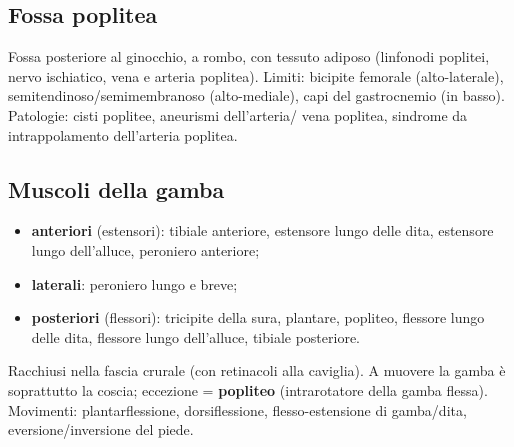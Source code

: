 \subsection{Fossa poplitea}
Fossa posteriore al ginocchio, a rombo, con tessuto adiposo (linfonodi poplitei, nervo ischiatico,
vena e arteria poplitea). Limiti: bicipite femorale (alto-laterale), semitendinoso/semimembranoso
(alto-mediale), capi del gastrocnemio (in basso). Patologie: cisti poplitee, aneurismi dell'arteria/
vena poplitea, sindrome da intrappolamento dell'arteria poplitea.

\subsection{Muscoli della gamba}
\begin{itemize}
  \item \textbf{anteriori} (estensori): tibiale anteriore, estensore lungo delle dita, estensore
    lungo dell'alluce, peroniero anteriore;
  \item \textbf{laterali}: peroniero lungo e breve;
  \item \textbf{posteriori} (flessori): tricipite della sura, plantare, popliteo, flessore lungo
    delle dita, flessore lungo dell'alluce, tibiale posteriore.
\end{itemize}
Racchiusi nella fascia crurale (con retinacoli alla caviglia). A muovere la gamba è soprattutto la
coscia; eccezione = \textbf{popliteo} (intrarotatore della gamba flessa). Movimenti: plantarflessione,
dorsiflessione, flesso-estensione di gamba/dita, eversione/inversione del piede.

